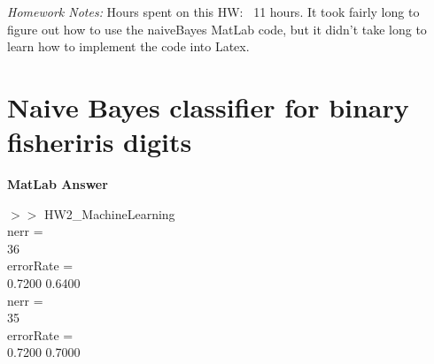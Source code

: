 \documentclass[12pt,letterpaper]{article}
\begin{document}
\noindent \emph{Homework Notes:} Hours spent on this HW: ~11 hours. It took fairly long to figure out how to use the naiveBayes MatLab code, but it didn't take long to learn how to implement the code into Latex.

\section*{Naive Bayes classifier for binary fisheriris digits}

\textbf{MatLab Answer}

$>>$ HW2\_MachineLearning\\
nerr =\\
    36\\
errorRate =\\
    0.7200    0.6400\\
nerr =\\
    35\\
errorRate =\\
    0.7200    0.7000\\
\end{document}
